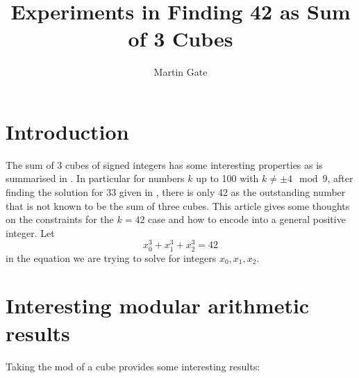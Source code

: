 \documentclass[a4paper,oneside,english]{article}
\numberwithin{equation}{section}
\numberwithin{figure}{section}
\numberwithin{table}{section}
\begin{document}
	\title{Experiments in Finding 42 as Sum of 3 Cubes }
	\author{Martin Gate}
	\maketitle
\section{Introduction}
The sum of 3 cubes of signed integers has some interesting properties as is summarised in \cite{3-cubes-sum}. In particular for numbers $k$ up to 100 with $k \neq \pm 4 \mod 9$, after finding the solution  for 33 given in  \cite{sum-3-cubes-33}, there is only 42 as the outstanding number that is not known to be the sum of three cubes. This article gives some thoughts on the constraints for the $k=42$ case and how to encode into a general positive integer. Let \begin{equation}\label{cubes-42}
x_0^3+x_1^3+x_2^3 =42
\end{equation}
in the equation we are trying to solve for integers $x_0,x_1,x_2$.

\section{Interesting modular arithmetic results}
Taking the mod of a cube provides some interesting results:
\end{document}
